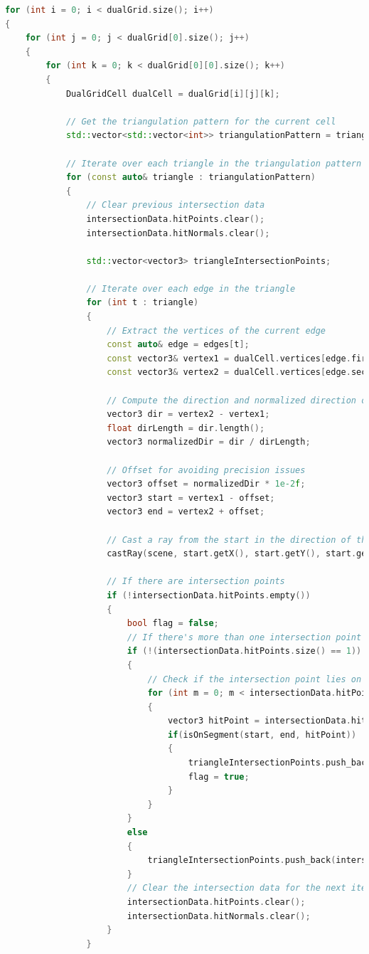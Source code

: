 \vspace{2mm}
\begin{lstlisting}[language=C++, caption=Mesh generation in Dual Marching Cubes Algorithm, label=lst:meshGenerationDMC]
for (int i = 0; i < dualGrid.size(); i++)
{
	for (int j = 0; j < dualGrid[0].size(); j++)
	{
		for (int k = 0; k < dualGrid[0][0].size(); k++)
		{
			DualGridCell dualCell = dualGrid[i][j][k];

			// Get the triangulation pattern for the current cell
			std::vector<std::vector<int>> triangulationPattern = triangulationTable[dualCell.cubeIndex];

			// Iterate over each triangle in the triangulation pattern
			for (const auto& triangle : triangulationPattern) 
			{
				// Clear previous intersection data
				intersectionData.hitPoints.clear();
				intersectionData.hitNormals.clear();

				std::vector<vector3> triangleIntersectionPoints;

				// Iterate over each edge in the triangle
				for (int t : triangle) 
				{
					// Extract the vertices of the current edge
					const auto& edge = edges[t];
					const vector3& vertex1 = dualCell.vertices[edge.first];
					const vector3& vertex2 = dualCell.vertices[edge.second];
					
					// Compute the direction and normalized direction of the edge
					vector3 dir = vertex2 - vertex1;
					float dirLength = dir.length();
					vector3 normalizedDir = dir / dirLength;

					// Offset for avoiding precision issues
					vector3 offset = normalizedDir * 1e-2f;
					vector3 start = vertex1 - offset;
					vector3 end = vertex2 + offset;

					// Cast a ray from the start in the direction of the edge
					castRay(scene, start.getX(), start.getY(), start.getZ(), dir.getX(), dir.getY(), dir.getZ());

					// If there are intersection points
					if (!intersectionData.hitPoints.empty())
					{
						bool flag = false;
						// If there's more than one intersection point
						if (!(intersectionData.hitPoints.size() == 1)) 
						{
							// Check if the intersection point lies on the segment
							for (int m = 0; m < intersectionData.hitPoints.size(); m++)
							{
								vector3 hitPoint = intersectionData.hitPoints[m];
								if(isOnSegment(start, end, hitPoint))
								{
									triangleIntersectionPoints.push_back(hitPoint);
									flag = true;
								}
							}
						}
                        else 
                        {
                        	triangleIntersectionPoints.push_back(intersectionData.hitPoints[0]);
                        }
						// Clear the intersection data for the next iteration
						intersectionData.hitPoints.clear();
						intersectionData.hitNormals.clear();
					}
				}


\end{lstlisting}
